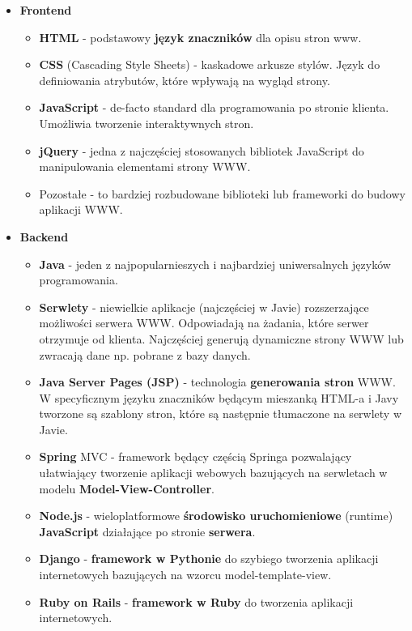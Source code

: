 \documentclass[../main.tex]{subfiles}
\begin{document}
    \begin{itemize}
        \item \textbf{Frontend}
        \begin{itemize}
            \item \textbf{HTML} - podstawowy \textbf{język znaczników} dla opisu stron www.
            \item \textbf{CSS} (Cascading Style Sheets) - kaskadowe arkusze stylów. Język do definiowania atrybutów, które wpływają na wygląd strony.
            \item \textbf{JavaScript} - de-facto standard dla programowania po stronie klienta. Umożliwia tworzenie interaktywnych stron.
            \item \textbf{jQuery} - jedna z najczęściej stosowanych bibliotek JavaScript do manipulowania elementami strony WWW.
            \item Pozostałe - to bardziej rozbudowane biblioteki lub frameworki do budowy aplikacji WWW.
        \end{itemize}
        \item \textbf{Backend}
        \begin{itemize}
            \item \textbf{Java} - jeden z najpopularnieszych i najbardziej uniwersalnych języków programowania.
            \item \textbf{Serwlety} - niewielkie aplikacje (najczęściej w Javie) rozszerzające możliwości serwera WWW. Odpowiadają na żadania, które serwer otrzymuje od klienta. Najczęściej generują dynamiczne strony WWW lub zwracają dane np. pobrane z bazy danych.
            \item \textbf{Java Server Pages (JSP)} - technologia \textbf{generowania stron} WWW. W specyficznym języku znaczników będącym mieszanką HTML-a i Javy tworzone są szablony stron, które są następnie tłumaczone na serwlety w Javie.
            \item \textbf{Spring} MVC - framework będący częścią Springa pozwalający ułatwiający tworzenie aplikacji webowych bazujących na serwletach w modelu \textbf{Model-View-Controller}.
            \item \textbf{Node.js} - wieloplatformowe \textbf{środowisko uruchomieniowe} (runtime) \textbf{JavaScript} działające po stronie \textbf{serwera}.
            \item \textbf{Django} - \textbf{framework w Pythonie} do szybiego tworzenia aplikacji internetowych bazujących na wzorcu model-template-view.
            \item \textbf{Ruby on Rails} - \textbf{framework w Ruby} do tworzenia aplikacji internetowych.

\end{itemize}
\end{itemize}
\end{document}
